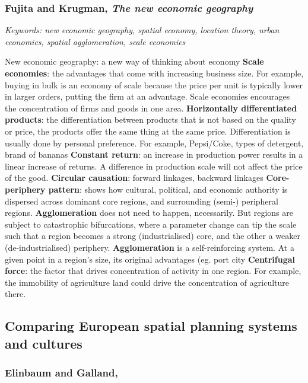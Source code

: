 \documentclass{article}
\begin{document}
\subsubsection{Fujita and Krugman, \textit{The new economic geography}}

\textit{Keywords: new economic geography, spatial economy, location theory, urban economics, spatial agglomeration, scale economies}

\begin{outline}
	\1 New economic geography: a new way of thinking about economy
	\1 \textbf{Scale economies}: the advantages that come with increasing business size. For example, buying in bulk is an economy of scale because the price per unit is typically lower in larger orders, putting the firm at an advantage.
Scale economies encourages the concentration of firms and goods in one area. 
	\1 \textbf{Horizontally differentiated products}: the differentiation between products that is not based on the quality or price, the products offer the same thing at the same price. Differentiation is usually done by personal preference. For example, Pepsi/Coke, types of detergent, brand of bananas
	\1 \textbf{Constant return}: an increase in production power results in a linear increase of returns. A difference in production scale will not affect the price of the good. 
	\1 \textbf{Circular causation}: forward linkages, backward linkages
	\1 \textbf{Core-periphery pattern}: shows how cultural, political, and economic authority is dispersed across dominant core regions, and surrounding (semi-) peripheral regions.
	\1 \textbf{Agglomeration} does not need to happen, necessarily. But regions are subject to catastrophic bifurcations, where a parameter change can tip the scale such that a region becomes a strong (industrialised) core, and the other a weaker (de-industrialised) periphery.
	\1 \textbf{Agglomeration} is a self-reinforcing system. At a given point in a region's size, its original advantages (eg. port city
	\1 \textbf{Centrifugal force}: the factor that drives concentration of activity in one region. For example, the immobility of agriculture land could drive the concentration of agriculture there.
\end{outline}

\subsection{Comparing European spatial planning systems and cultures}

\subsubsection{Elinbaum and Galland, \textit{}}
\end{document}

